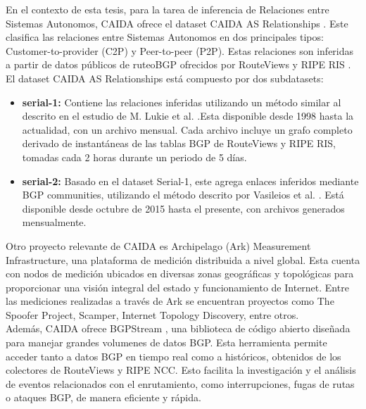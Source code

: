 En el contexto de esta tesis, para la tarea de inferencia de Relaciones entre Sistemas Autonomos, CAIDA ofrece 
el dataset CAIDA AS Relationships \cite{CAIDAS-relationship}. Este clasifica las relaciones entre Sistemas 
Autonomos en dos principales tipos: Customer-to-provider (C2P) y Peer-to-peer (P2P). Estas relaciones son 
inferidas a partir de datos públicos de ruteoBGP ofrecidos por RouteViews \cite{RouteViewsProject} y RIPE RIS \cite{RIPE-RIS}.\\

El dataset CAIDA AS Relationships está compuesto por dos subdatasets:
\begin{itemize}
    \item \textbf{serial-1:} Contiene las relaciones inferidas utilizando un método similar al descrito en el estudio de M. Lukie 
    et al. \cite{ASRank} .Esta disponible desde 1998 hasta la actualidad, con un archivo mensual. Cada archivo incluye un grafo 
    completo derivado de instantáneas de las tablas BGP de RouteViews y RIPE RIS, tomadas cada 2 horas durante un periodo de 5 días.\\
    \item \textbf{serial-2:} Basado en el dataset Serial-1, este agrega enlaces inferidos mediante BGP communities, utilizando el método 
    descrito por Vasileios et al. \cite{Inferring-Multilateral-Peering} . Está disponible desde octubre de 2015 hasta el presente, con 
    archivos generados mensualmente.\\
\end{itemize}

Otro proyecto relevante de CAIDA es Archipelago (Ark) Measurement Infrastructure, una plataforma de medición distribuida a nivel global. 
Esta cuenta con nodos de medición ubicados en diversas zonas geográficas y topológicas para proporcionar una visión integral del estado y 
funcionamiento de Internet. Entre las mediciones realizadas a través de Ark se encuentran proyectos como The Spoofer Project, Scamper, 
Internet Topology Discovery, entre otros.\\


Además, CAIDA ofrece BGPStream \cite{BGPStream}, una biblioteca de código abierto diseñada para manejar grandes volumenes de datos BGP. 
Esta herramienta permite acceder tanto a datos BGP en tiempo real como a históricos, obtenidos de los colectores de RouteViews y RIPE NCC. 
Esto facilita la investigación y el análisis de eventos relacionados con el enrutamiento, como interrupciones, fugas de rutas o ataques BGP, 
de manera eficiente y rápida.\\



